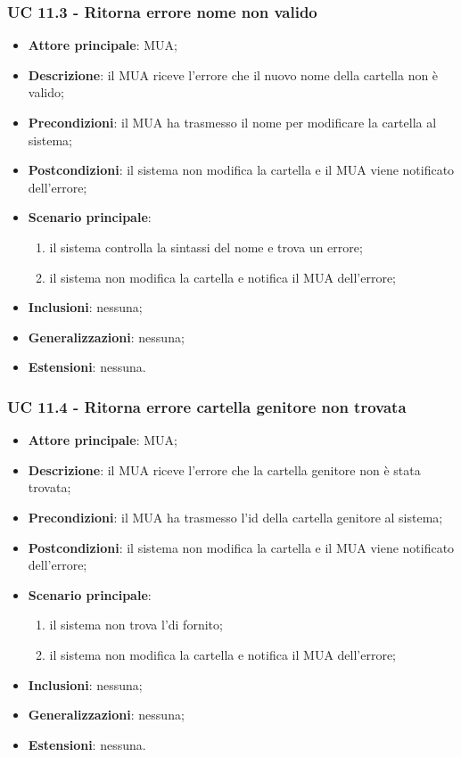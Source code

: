 \subsubsection{UC 11.3 - Ritorna errore nome non valido} \label{sec:UC11.3}
\begin{itemize}
    \item \textbf{Attore principale}: MUA;
    \item \textbf{Descrizione}: il MUA riceve l'errore che il nuovo nome della cartella non è valido;
    \item \textbf{Precondizioni}:  il MUA ha trasmesso il nome per modificare la cartella al sistema;
    \item \textbf{Postcondizioni}: il sistema non modifica la cartella e il MUA viene notificato dell'errore;
    \item \textbf{Scenario principale}:
        \begin{enumerate}
            \item il sistema controlla la sintassi del nome e trova un errore;
            \item il sistema non modifica la cartella e notifica il MUA dell'errore;
        \end{enumerate}
    \item \textbf{Inclusioni}: nessuna;
    \item \textbf{Generalizzazioni}: nessuna;
    \item \textbf{Estensioni}: nessuna.
\end{itemize}

\subsubsection{UC 11.4 - Ritorna errore cartella genitore non trovata} \label{sec:UC11.4}
\begin{itemize}
    \item \textbf{Attore principale}: MUA;
    \item \textbf{Descrizione}: il MUA riceve l'errore che la cartella genitore non è stata trovata;
    \item \textbf{Precondizioni}: il MUA ha trasmesso l'id della cartella genitore al sistema;
    \item \textbf{Postcondizioni}: il sistema non modifica la cartella e il MUA viene notificato dell'errore;
    \item \textbf{Scenario principale}:
        \begin{enumerate}
            \item il sistema non trova l'di fornito;
            \item il sistema non modifica la cartella e notifica il MUA dell'errore;
        \end{enumerate}
    \item \textbf{Inclusioni}: nessuna;
    \item \textbf{Generalizzazioni}: nessuna;
    \item \textbf{Estensioni}: nessuna.
\end{itemize}

